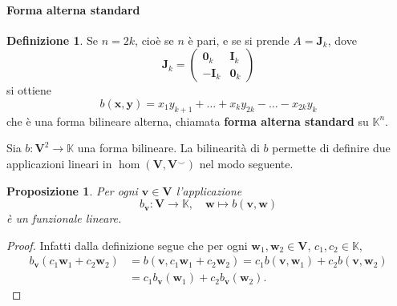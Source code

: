 \documentclass{article}
\theoremstyle{plain}
\newtheorem{prop}[thm]{Proposizione}
\theoremstyle{definition}
\newtheorem{defn}{Definizione}[section]
\theoremstyle{remark}
\begin{document}
\vspace{10pt}

\paragraph{Forma alterna standard}
\begin{bxthm}
\begin{defn}
Se $n = 2k$, cioè se $n$ è pari, e se si prende $A = \mathbf{J}_k$, dove
\[
\mathbf{J}_k = \begin{pmatrix}
\mathbf{0}_k & \mathbf{I}_k \\
- \mathbf{I}_k & \mathbf{0}_k
\end{pmatrix}
\]
si ottiene
\[
b(\mathbf{x},\mathbf{y}) = x_1 y_{k+1} + \ldots + x_k y_{2k} - \ldots - x_{2k} y_k
\]
che è una forma bilineare alterna, chiamata \textbf{forma alterna standard} su $\mathbb{K}^n$.    
\end{defn}
\end{bxthm}

\vspace{10pt}

Sia $b : \mathbf{V}^2 \to \mathbb{K}$ una forma bilineare. 
La bilinearità di $b$ permette di definire due applicazioni lineari in $\hom(\mathbf{V},\mathbf{V}^\smallsmile)$ 
nel modo seguente.  

\vspace{10pt}

\begin{bxthm}
\begin{prop}
Per ogni $\mathbf{v} \in \mathbf{V}$ l'applicazione 
\[b_\mathbf{v} : \mathbf{V} \to \mathbb{K},\quad \mathbf{w}\mapsto b(\mathbf{v},\mathbf{w})\]
è un funzionale lineare.     
\end{prop}
\end{bxthm}
\begin{proof}
Infatti dalla definizione segue che per ogni $\mathbf{w}_1, \mathbf{w}_2 \in \mathbf{V}$, $c_1, c_2 \in \mathbb{K}$,
\begin{align*}
b_\mathbf{v}(c_1 \mathbf{w}_1 + c_2 \mathbf{w}_2) &= b(\mathbf{v}, c_1 \mathbf{w}_1 + c_2 \mathbf{w}_2) = c_1 b(\mathbf{v}, \mathbf{w}_1) + c_2 b(\mathbf{v}, \mathbf{w}_2) \\
&= c_1 b_\mathbf{v}(\mathbf{w}_1) + c_2 b_\mathbf{v}(\mathbf{w}_2).
\end{align*}    
\end{proof}

\vspace{10pt}
\end{document}
